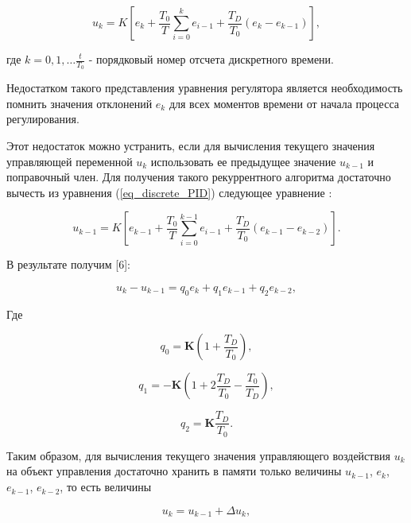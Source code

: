 \begin{equation}
    \label{eq_discrete_PID}
    u_k = K\left[ e_k + \frac{T_0}{T} \sum_{i = 0}^{k} {e_{i - 1}} + \frac{T_D}{T_0} (e_k - e_{k - 1})\right],
\end{equation}

где $k = 0, 1, \ldots\frac{t}{T_0}$ - порядковый номер отсчета дискретного времени.

Недостатком такого представления уравнения регулятора является необходимость помнить значения отклонений $e_k$ для всех моментов времени от начала процесса регулирования.

Этот недостаток можно устранить, если для вычисления текущего значения управляющей переменной $u_k$ использовать ее предыдущее значение $u_{k - 1}$ и поправочный член. Для получения такого рекуррентного алгоритма достаточно вычесть из уравнения (\ref{eq_discrete_PID}) следующее уравнение \cite{PID_NIL_AP}:

\begin{equation}
        u_{k - 1} = K \left[e_{k - 1} + \frac{T_0}{T} \sum_{i=0}^{k-1}{e_{i - 1}}+\frac{T_D}{T_0}(e_{k - 1} - e_{k - 2})\right].
\end{equation}

В результате получим [6]:

\begin{equation}
    u_k - u_{k - 1} = q_0 e_k + q_1 e_{k - 1} + q_2 e_{k - 2},
\end{equation}

Где

\begin{equation}
    q_0=\mathbf{K}\left(1+\frac{T_D}{T_0}\right),
\end{equation}

\begin{equation}
    q_1=-\mathbf{K}\left(1+2\frac{T_D}{T_0}-\frac{T_0}{T_D}\right),
\end{equation}

\begin{equation}
    q_2=\mathbf{K}\frac{T_D}{T_0}.
\end{equation}

Таким образом, для вычисления текущего значения управляющего воздействия $u_k$ на объект управления достаточно хранить в памяти только величины $u_{k - 1}$, $e_k$, $e_{k - 1}$, $e_{k - 2}$, то есть величины

\begin{equation}
    u_k = u_{k - 1} + \Delta u_k,
\end{equation}

